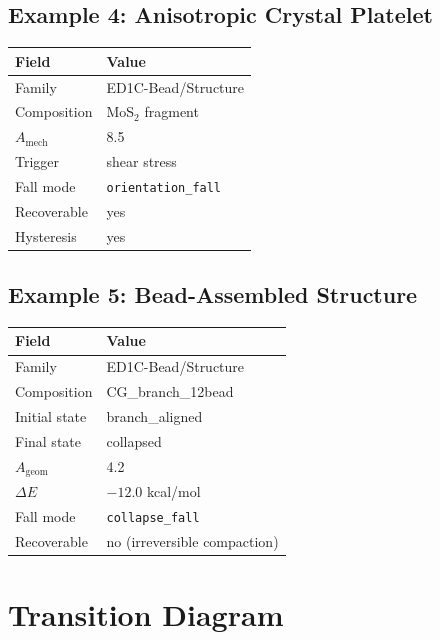 \documentclass[11pt]{article}
\begin{document}
\subsection{Example 4: Anisotropic Crystal Platelet}

\begin{center}
\begin{tabular}{lp{9cm}}
\toprule
\textbf{Field} & \textbf{Value} \\
\midrule
Family & ED1C-Bead/Structure \\
Composition & MoS$_2$ fragment \\
$A_{\text{mech}}$ & 8.5 \\
Trigger & shear stress \\
Fall mode & \texttt{orientation\_fall} \\
Recoverable & yes \\
Hysteresis & yes \\
\bottomrule
\end{tabular}
\end{center}

\subsection{Example 5: Bead-Assembled Structure}

\begin{center}
\begin{tabular}{lp{9cm}}
\toprule
\textbf{Field} & \textbf{Value} \\
\midrule
Family & ED1C-Bead/Structure \\
Composition & CG\_branch\_12bead \\
Initial state & branch\_aligned \\
Final state & collapsed \\
$A_{\text{geom}}$ & 4.2 \\
$\Delta E$ & $-12.0$ kcal/mol \\
Fall mode & \texttt{collapse\_fall} \\
Recoverable & no (irreversible compaction) \\
\bottomrule
\end{tabular}
\end{center}

\section{Transition Diagram}
\end{document}
